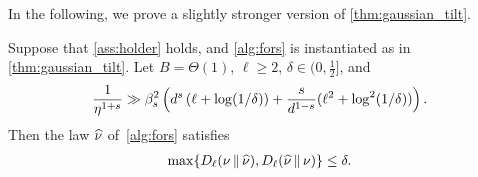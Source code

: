 


In the following, we prove a slightly stronger version of \cref{thm:gaussian_tilt}.

\begin{theorem}\label{thm:gaussian_tilt_full}
Suppose that \cref{ass:holder} holds, and \cref{alg:fors} is instantiated as in \cref{thm:gaussian_tilt}. Let $B=\Theta(1)$, $\ell\geq 2$, $\delta\in(0,\frac12]$, and
\begin{align*}
    \frac{1}{\eta^{1+s}}\gg \beta_s^2\,\prn[\Big]{d^s\,(\ell+\log(1/\delta))+\frac{s}{d^{1-s}}(\ell^2+\log^2(1/\delta))}\,.
\end{align*}
Then the law $\wh\nu$ of~\cref{alg:fors} satisfies
\begin{align*}
    \max\crl*{ \Dren[\ell]{\nu}{\nuhat}, \Dren[\ell]{\nuhat}{\nu} }\leq \delta.
\end{align*}
\end{theorem}

